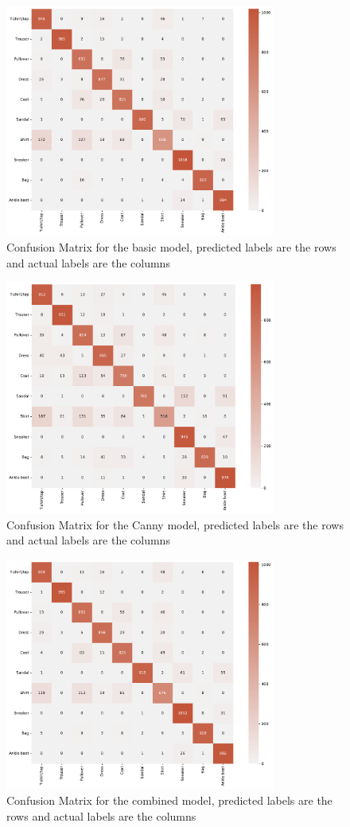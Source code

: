 \begin{figure}[!h]
    \centering
    \includegraphics[width=3.5in]{basic_knn_cmatrix.pdf}
    \caption{Confusion Matrix for the basic model, predicted labels are the rows and actual labels are the columns}
    \label{fig:my_label}
\end{figure}

\begin{figure}[!h]
    \centering
    \includegraphics[width=3.5in]{canny_knn_cmatrix.pdf}
    \caption{Confusion Matrix for the Canny model, predicted labels are the rows and actual labels are the columns}
    \label{fig:my_label}
\end{figure}

\begin{figure}[!h]
    \centering
    \includegraphics[width=3.5in]{combined_knn_cmatrix.pdf}
    \caption{Confusion Matrix for the combined model, predicted labels are the rows and actual labels are the columns}
    \label{fig:my_label}
\end{figure}



